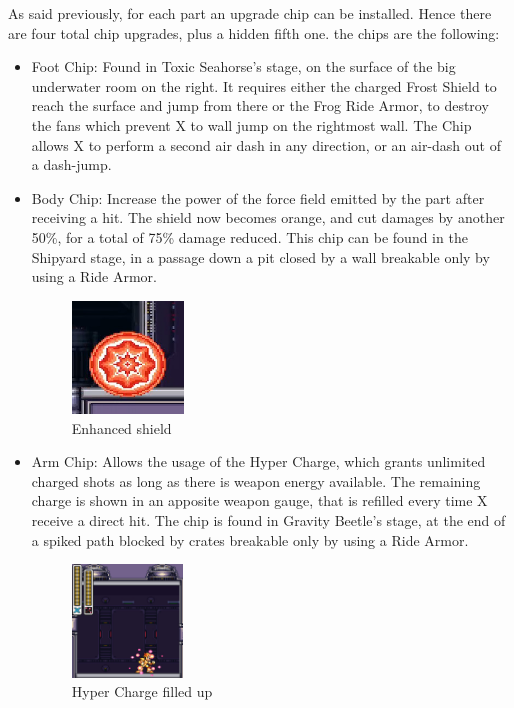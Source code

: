 As said previously, for each part an upgrade chip can be installed. Hence there are four total chip upgrades, plus a hidden fifth one. the chips are the following:
\begin{itemize}
	\item Foot Chip: Found in Toxic Seahorse's stage, on the surface of the big underwater room on the right. It requires either the charged Frost Shield to reach the surface and jump from there or the Frog Ride Armor, to destroy the fans which prevent X to wall jump on the rightmost wall. The Chip allows X to perform a second air dash in any direction, or an air-dash out of a dash-jump.

	\item Body Chip: Increase the power of the force field emitted by the part after receiving a hit. The shield now becomes orange, and cut damages by another 50\%, for a total of 75\% damage reduced. This chip can be found in the Shipyard stage, in a passage down a pit closed by a wall breakable only by using a Ride Armor.
	\begin{figure}[htp]
		\centering
		\includegraphics[height=3cm]{figures/X3/weapons/orange_shield.png}
		\caption{Enhanced shield}	
	\end{figure}


	\item Arm Chip: Allows the usage of the Hyper Charge, which grants unlimited charged shots as long as there is weapon energy available. The remaining charge is shown in an apposite weapon gauge, that is refilled every time X receive a direct hit. The chip is found in Gravity Beetle's stage, at the end of a spiked path blocked by crates breakable only by using a Ride Armor.
	\begin{figure}[htp]
		\centering
		\includegraphics[height=3cm]{figures/X3/weapons/Hyper_shot.png}
		\caption{Hyper Charge filled up}	
	\end{figure}
	

\end{itemize}
